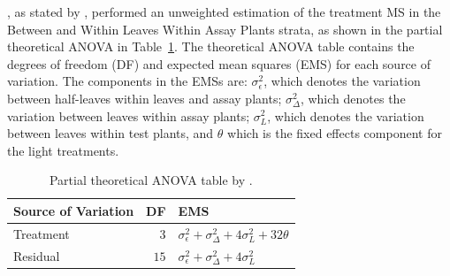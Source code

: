 
\cite{McIntyre1955}, as stated by \cite{Curnow1959}, performed an unweighted estimation of the treatment MS in the Between and Within Leaves Within Assay Plants strata, as shown in the partial theoretical ANOVA in Table~\ref{tab:McIntyre1955}. The theoretical ANOVA table contains the degrees of freedom (DF) and expected mean squares (EMS) for each source of variation. The components in the EMSs are: $\sigma_{\epsilon}^2$, which denotes the variation between half-leaves within leaves and assay plants; $\sigma_{\Delta}^2$, which denotes the variation between leaves within assay plants; $\sigma_{L}^2$, which denotes the variation between leaves within test plants, and $\theta$ which is the fixed effects component for the light treatments. 


\begin{table}[ht]
\centering
\caption{Partial theoretical ANOVA table by \cite{McIntyre1955}.}
\begin{tabular}{lrl} 
\toprule 
\multicolumn{1}{l}{\textbf{Source of Variation}} & \multicolumn{1}{l}{\textbf{DF}} & \multicolumn{1}{l}{\textbf{EMS}}\\ 
\midrule 
Treatment & $3$ & $\sigma_{\epsilon}^2 + \sigma_{\Delta}^2 + 4\sigma_{L}^2 + 32\theta$ \\ 
Residual & $15$ & $\sigma_{\epsilon}^2 + \sigma_{\Delta}^2 + 4\sigma_{L}^2$ \\  
\bottomrule 
\end{tabular}
\label{tab:McIntyre1955} 
\end{table} 

